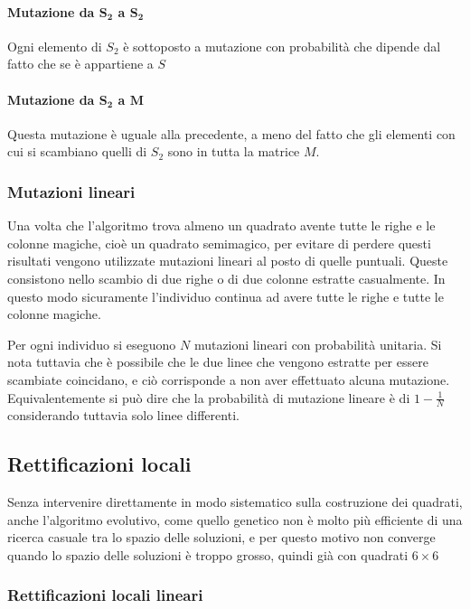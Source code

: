 \documentclass[italian,twoside,twocolumn]{article}
\begin{document}
\paragraph{Mutazione da $ \mathbf{S_2} $ a $ \mathbf{S_2} $}
Ogni elemento di $ S_2 $ è sottoposto a mutazione con probabilità che dipende dal fatto che se è appartiene a $ S_{} $

\paragraph{Mutazione da $ \mathbf{S_2} $ a $ \mathbf{M} $}
Questa mutazione è uguale alla precedente, a meno del fatto che gli elementi con cui si scambiano quelli di $ S_2 $ sono in tutta la matrice $ M $.

\subsubsection{Mutazioni lineari}
Una volta che l'algoritmo trova almeno un quadrato avente tutte le righe e le colonne magiche, cioè un quadrato semimagico, per evitare di perdere questi risultati vengono utilizzate mutazioni lineari al posto di quelle puntuali. Queste consistono nello scambio di due righe o di due colonne estratte casualmente. In questo modo sicuramente l'individuo continua ad avere tutte le righe e tutte le colonne magiche. 

Per ogni individuo si eseguono $ N $ mutazioni lineari con probabilità unitaria. Si nota tuttavia che è possibile che le due linee che vengono estratte per essere scambiate coincidano, e ciò corrisponde a non aver effettuato alcuna mutazione. Equivalentemente si può dire che la probabilità di mutazione lineare è di $ 1 - \frac{1}{N} $ considerando tuttavia solo linee differenti. 

\subsection{Rettificazioni locali}

Senza intervenire direttamente in modo sistematico sulla costruzione dei quadrati, anche l'algoritmo evolutivo, come quello genetico non è molto più efficiente di una ricerca casuale tra lo spazio delle soluzioni, e per questo motivo non converge quando lo spazio delle soluzioni è troppo grosso, quindi già con quadrati $ 6\times6 $


\subsubsection{Rettificazioni locali lineari}
\end{document}
